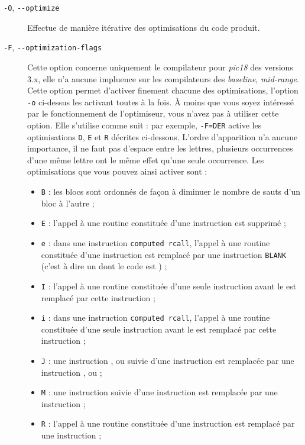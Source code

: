 \begin{description}

  \item[\texttt{-O}, \texttt{-{-}optimize}] Effectue de manière itérative des optimisations du code produit.


  \item[\texttt{-F}, \texttt{-{-}optimization-flags}] Cette option concerne uniquement le compilateur pour \emph{pic18} des versions 3.x, elle n'a aucune impluence sur les compilateurs des \emph{baseline}, \emph{mid-range}. Cette option permet d'activer finement chacune des optimisations, l'option \texttt{-o} ci-dessus les activant toutes à la fois. À moins que vous soyez intéressé par le fonctionnement de l'optimiseur, vous n'avez pas à utiliser cette option. Elle s'utilise comme suit : par exemple, \texttt{-F=DER} active les optimisations \texttt{D}, \texttt{E} et \texttt{R} décrites ci-dessous. L'ordre d'apparition n'a aucune importance, il ne faut pas d'espace entre les lettres, plusieurs occurrences d'une même lettre ont le même effet qu'une seule occurrence. Les optimisations que vous pouvez ainsi activer sont :
\begin{itemize}
  \item \texttt{B} : les blocs sont ordonnés de façon à diminuer le nombre de sauts d'un bloc à l'autre ;
  \item \texttt{E} : l'appel à une routine constituée d'une instruction  est supprimé ;
  \item \texttt{e} : dans une instruction \texttt{computed rcall}, l'appel à une routine constituée d'une instruction  est remplacé par une instruction \texttt{BLANK} (c'est à dire un  dont le code est ) ;
  \item \texttt{I} : l'appel à une routine constituée d'une seule instruction avant le  est remplacé par cette instruction ;
  \item \texttt{i} : dans une instruction \texttt{computed rcall}, l'appel à une routine constituée d'une seule instruction avant le  est remplacé par cette instruction ;
  \item \texttt{J} : une instruction ,  ou  suivie d'une instruction  est remplacée par une instruction ,  ou  ;
  \item \texttt{M} : une instruction  suivie d'une instruction  est remplacée par une instruction  ;
  \item \texttt{R} : l'appel à une routine constituée d'une instruction  est remplacé par une instruction  ;
\end{itemize}




\end{description}
